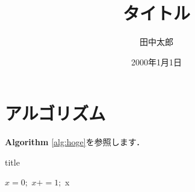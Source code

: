 \documentclass[a4paper,10pt]{jsarticle}
\title{タイトル}%
\author{田中太郎}%
\date{2000年1月1日}%
\begin{document}
\maketitle%

\section{アルゴリズム}
{\bf{Algorithm}} \ref{alg:hoge}を参照します．

\begin{algorithm*}[H]
    \small{
        \caption{title}
        \label{alg:hoge}
        $x = 0;$
        {
            $x += 1;$
        }
        \Return x
    }
\end{algorithm*}
\end{document}
